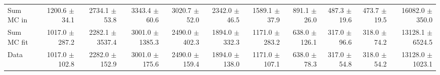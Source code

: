 \begin{table}[htbp]
{\begin{tabular}{lrrrrrrrrrr}
\hline
Sum MC in & 1200.6 $\pm$ 34.1 & 2734.1 $\pm$ 53.8 & 3343.4 $\pm$ 60.6 & 3020.7 $\pm$ 52.0 & 2342.0 $\pm$ 46.5 & 1589.1 $\pm$ 37.9 & 891.1 $\pm$ 26.0 & 487.3 $\pm$ 19.6 & 473.7 $\pm$ 19.5& 16082.0 $\pm$ 350.0 \\
Sum MC fit & 1017.0 $\pm$ 287.2 & 2282.1 $\pm$ 3537.4 & 3001.0 $\pm$ 1385.3 & 2490.0 $\pm$ 402.3 & 1894.0 $\pm$ 332.3 & 1171.0 $\pm$ 283.2 & 638.0 $\pm$ 126.1 & 317.0 $\pm$ 96.6 & 318.0 $\pm$ 74.2 & 13128.1 $\pm$ 6524.5 \\
\hline
Data & 1017.0 $\pm$ 102.8 & 2282.0 $\pm$ 152.9 & 3001.0 $\pm$ 175.6 & 2490.0 $\pm$ 159.4 & 1894.0 $\pm$ 138.0 & 1171.0 $\pm$ 107.1 & 638.0 $\pm$ 78.3 & 317.0 $\pm$ 54.8 & 318.0 $\pm$ 54.2 & 13128.0 $\pm$ 1023.1 \\
\hline
\end{tabular}
}
\end{table}
